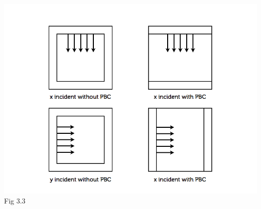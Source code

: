 \documentclass[openany]{book}
\begin{document}
\begin{center}
\includegraphics[scale=0.5]{images/tfsf-pbc.jpg}\\
Fig 3.3
\end{center}
\end{document}
